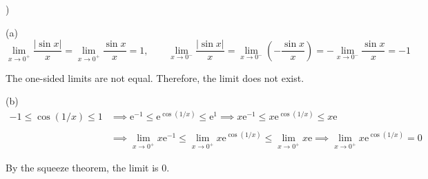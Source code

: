 \documentclass{article}
\begin{document}
)

\hfill

\noindent (a) \begin{equation*}\lim_{x\to 0^+} \frac{\left|\sin x\right|}{x}=\lim_{x\to 0^+}\frac{\sin x}{x}=1,\quad\quad \lim_{x\to 0^-} \frac{\left|\sin x\right|}{x}=\lim_{x\to0^-}\left(-\frac{\sin x}{x}\right)=-\lim_{x\to0^-}\frac{\sin x}{x}=-1\end{equation*}

\hfill

\noindent The one-sided limits are not equal. Therefore, the limit does not exist.

\hfill

\noindent (b)
\begin{align*}-1\leq \cos(1/x)\leq1&\implies\mathrm{e}^{-1}\leq\mathrm{e}^{\cos(1/x)}\leq\mathrm{e}^1\implies x\mathrm{e}^{-1}\leq x\mathrm{e}^{\cos(1/x)}\leq x\mathrm{e}\\\\&\implies\lim_{x\to 0^+} x\mathrm{e}^{-1}\leq\lim_{x\to 0^+}  x\mathrm{e}^{\cos(1/x)}\leq\lim_{x\to 0^+} x\mathrm{e}\implies\lim_{x\to 0^+} x\mathrm{e}^{\cos(1/x)}=0\end{align*}

\hfill

\noindent By the squeeze theorem, the limit is 0.

\hfill
\end{document}
